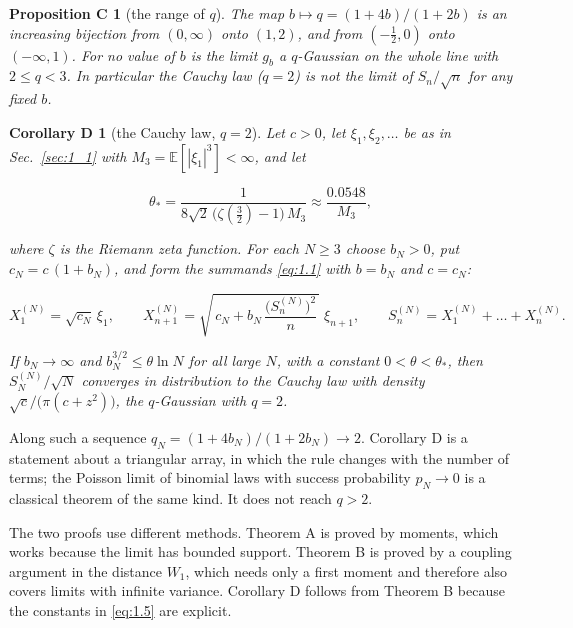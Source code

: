 \documentclass[aip,jmp,preprint,onecolumn,floatfix,superscriptaddress,nofootinbib,11pt]{revtex4-2}
\theoremstyle{plain}
\newtheorem*{propositionC}{Proposition C}
\newtheorem*{corollaryD}{Corollary D}
\theoremstyle{remark}
\numberwithin{equation}{section}
\newcommand{\E}{\mathbb{E}}
\begin{document}
\begin{propositionC}[the range of $q$]

The map $b\mapsto q=(1+4b)/(1+2b)$ is an increasing bijection from $(0,\infty)$ onto $(1,2)$, and from $(-\tfrac12,0)$ onto $(-\infty,1)$. For no value of $b$ is the limit $g_b$ a $q$-Gaussian on the whole line with $2\le q<3$. In particular the Cauchy law ($q=2$) is not the limit of $S_n/\sqrt n$ for any fixed $b$.

\end{propositionC}

\begin{corollaryD}[the Cauchy law, $q=2$]

Let $c>0$, let $\xi_1,\xi_2,\dots$ be as in Sec.~\ref{sec:1_1} with $M_3=\E[|\xi_1|^{3}]<\infty$, and let

\begin{equation}
\theta_*=\frac{1}{8\sqrt2\,\big(\zeta(\tfrac32)-1\big)\,M_3}\approx\frac{0.0548}{M_3},
\label{eq:1.6}
\end{equation}

where $\zeta$ is the Riemann zeta function. For each $N\ge3$ choose $b_N>0$, put $c_N=c\,(1+b_N)$, and form the summands \eqref{eq:1.1} with $b=b_N$ and $c=c_N$:

\begin{equation*}
X^{(N)}_1=\sqrt{c_N}\,\xi_1,\qquad X^{(N)}_{n+1}=\sqrt{\,c_N+b_N\,\frac{\big(S^{(N)}_n\big)^{2}}{n}\,}\;\xi_{n+1},\qquad S^{(N)}_n=X^{(N)}_1+\dots+X^{(N)}_n .
\end{equation*}

If $b_N\to\infty$ and $b_N^{3/2}\le\theta\ln N$ for all large $N$, with a constant $0<\theta<\theta_*$, then $S^{(N)}_N/\sqrt N$ converges in distribution to the Cauchy law with density $\sqrt c/\big(\pi(c+z^{2})\big)$, the $q$-Gaussian with $q=2$.

\end{corollaryD}

Along such a sequence $q_N=(1+4b_N)/(1+2b_N)\to2$. Corollary D is a statement about a triangular array, in which the rule changes with the number of terms; the Poisson limit of binomial laws with success probability $p_N\to0$ is a classical theorem of the same kind. It does not reach $q>2$.

The two proofs use different methods. Theorem A is proved by moments, which works because the limit has bounded support. Theorem B is proved by a coupling argument in the distance $W_1$, which needs only a first moment and therefore also covers limits with infinite variance. Corollary D follows from Theorem B because the constants in \eqref{eq:1.5} are explicit.
\end{document}
